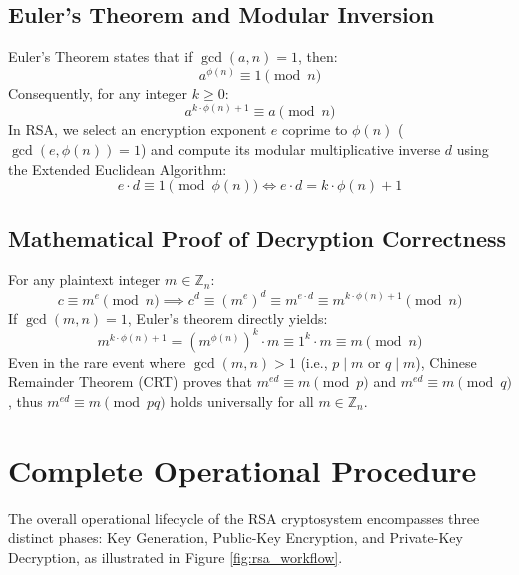 \subsection{Euler's Theorem and Modular Inversion}
Euler's Theorem states that if $\gcd(a, n) = 1$, then:
\begin{equation}
a^{\phi(n)} \equiv 1 \pmod n
\end{equation}
Consequently, for any integer $k \ge 0$:
\begin{equation}
a^{k \cdot \phi(n) + 1} \equiv a \pmod n
\end{equation}
In RSA, we select an encryption exponent $e$ coprime to $\phi(n)$ ($\gcd(e, \phi(n)) = 1$) and compute its modular multiplicative inverse $d$ using the Extended Euclidean Algorithm:
\begin{equation}
e \cdot d \equiv 1 \pmod{\phi(n)} \iff e \cdot d = k \cdot \phi(n) + 1
\end{equation}

\subsection{Mathematical Proof of Decryption Correctness}
For any plaintext integer $m \in \mathbb{Z}_n$:
\begin{equation}
c \equiv m^e \pmod n \implies c^d \equiv (m^e)^d \equiv m^{e \cdot d} \equiv m^{k \cdot \phi(n) + 1} \pmod n
\end{equation}
If $\gcd(m, n) = 1$, Euler's theorem directly yields:
\begin{equation}
m^{k \cdot \phi(n) + 1} = (m^{\phi(n)})^k \cdot m \equiv 1^k \cdot m \equiv m \pmod n
\end{equation}
Even in the rare event where $\gcd(m, n) > 1$ (i.e., $p \mid m$ or $q \mid m$), Chinese Remainder Theorem (CRT) proves that $m^{ed} \equiv m \pmod p$ and $m^{ed} \equiv m \pmod q$, thus $m^{ed} \equiv m \pmod{pq}$ holds universally for all $m \in \mathbb{Z}_n$.

\section{Complete Operational Procedure}
The overall operational lifecycle of the RSA cryptosystem encompasses three distinct phases: Key Generation, Public-Key Encryption, and Private-Key Decryption, as illustrated in Figure \ref{fig:rsa_workflow}.

